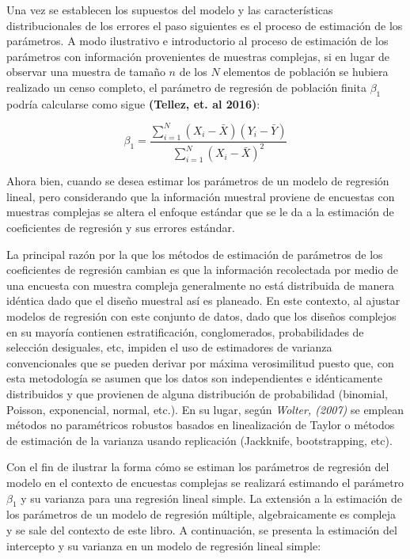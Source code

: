\documentclass[
  12pt,
]{book}
\begin{document}
Una vez se establecen los supuestos del modelo y las características distribucionales de los errores el paso siguientes es el proceso de estimación de los parámetros. A modo ilustrativo e introductorio al proceso de estimación de los parámetros con información provenientes de muestras complejas, si en lugar de observar una muestra de tamaño \(n\) de los \(N\) elementos de población se hubiera realizado un censo completo, el parámetro de regresión de población finita \(\beta_{1}\) podría calcularse como sigue \textbf{(Tellez, et. al 2016)}:

\[
\beta_{1}  =  \frac{{\displaystyle \sum_{i=1}^{N}\left(X_{i}-\bar{X}\right)\left(Y_{i}-\bar{Y}\right)}}{\sum_{i=1}^{N}\left(X_{i}-\bar{X}\right)^{2}}
\]

Ahora bien, cuando se desea estimar los parámetros de un modelo de regresión lineal, pero considerando que la información muestral proviene de encuestas con muestras complejas se altera el enfoque estándar que se le da a la estimación de coeficientes de regresión y sus errores estándar.

La principal razón por la que los métodos de estimación de parámetros de los coeficientes de regresión cambian es que la información recolectada por medio de una encuesta con muestra compleja generalmente no está distribuida de manera idéntica dado que el diseño muestral así es planeado. En este contexto, al ajustar modelos de regresión con este conjunto de datos, dado que los diseños complejos en su mayoría contienen estratificación, conglomerados, probabilidades de selección desiguales, etc, impiden el uso de estimadores de varianza convencionales que se pueden derivar por máxima verosimilitud puesto que, con esta metodología se asumen que los datos son independientes e idénticamente distribuidos y que provienen de alguna distribución de probabilidad (binomial, Poisson, exponencial, normal, etc.). En su lugar, según \emph{Wolter, (2007)} se emplean métodos no paramétricos robustos basados en linealización de Taylor o métodos de estimación de la varianza usando replicación (Jackknife, bootstrapping, etc).

Con el fin de ilustrar la forma cómo se estiman los parámetros de regresión del modelo en el contexto de encuestas complejas se realizará estimando el parámetro \(\beta_{1}\) y su varianza para una regresión lineal simple. La extensión a la estimación de los parámetros de un modelo de regresión múltiple, algebraicamente es compleja y se sale del contexto de este libro. A continuación, se presenta la estimación del intercepto y su varianza en un modelo de regresión lineal simple:
\end{document}
